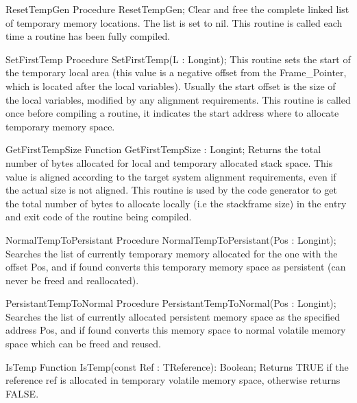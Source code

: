 \documentclass [a4paper,12pt]{article}
\begin{document}
\begin{procedure}{ResetTempGen}
\Declaration
Procedure ResetTempGen;
\Description
Clear and free the complete linked list of temporary memory locations. The
list is set to nil.
\Notes
This routine is called each time a routine has been fully compiled.
\end{procedure}

\begin{procedure}{SetFirstTemp}
\Declaration
Procedure SetFirstTemp(L : Longint);
\Description
This routine sets the start of the temporary local area (this value is a
negative offset from the Frame{\_}Pointer, which is located after the local
variables). Usually the start offset is the size of the local variables,
modified by any alignment requirements.
\Notes
This routine is called once before compiling a routine, it indicates the
start address where to allocate temporary memory space.
\end{procedure}

\begin{function}{GetFirstTempSize}
\Declaration
Function GetFirstTempSize : Longint;
\Description
Returns the total number of bytes allocated for local and temporary
allocated stack space. This value is aligned according to the target system
alignment requirements, even if the actual size is not aligned.
\Notes
This routine is used by the code generator to get the total number of bytes
to allocate locally (i.e the stackframe size) in the entry and exit code of
the routine being compiled.
\end{function}

\begin{function}{NormalTempToPersistant}
\Declaration
Procedure NormalTempToPersistant(Pos : Longint);
\Description
Searches the list of currently temporary memory allocated for the one with
the offset \textsf{Pos}, and if found converts this temporary memory space
as persistent (can never be freed and reallocated).
\end{function}

\begin{function}{PersistantTempToNormal}
\Declaration
Procedure PersistantTempToNormal(Pos : Longint);
\Description
Searches the list of currently allocated persistent memory space as the
specified address \textsf{Pos}, and if found converts this memory space to
normal volatile memory space which can be freed and reused.
\end{function}

\begin{function}{IsTemp}
\Declaration
Function IsTemp(const Ref : TReference): Boolean;
\Description
Returns TRUE if the reference \textsf{ref }is allocated in temporary
volatile memory space, otherwise returns FALSE.
\end{function}
\end{document}
